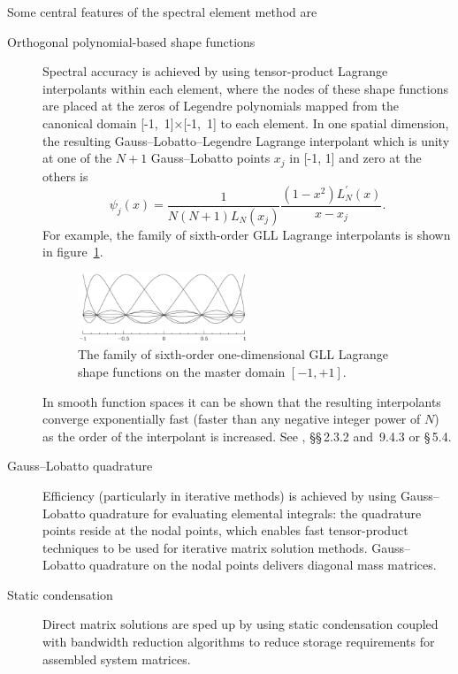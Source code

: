\documentclass[11pt]{report}
\begin{document}
Some central features of the spectral element method are
\begin{description}
\item[Orthogonal polynomial-based shape functions] Spectral accuracy
is achieved by using tensor-product Lagrange interpolants within each
element, where the nodes of these shape functions are placed at the
zeros of Legendre polynomials mapped from the canonical domain
[-1,~1]$\times$[-1,~1] to each element.  In one spatial dimension, the
resulting Gauss--Lobatto--Legendre Lagrange interpolant which is unity
at one of the $N + 1$ Gauss--Lobatto points $x_j$ in [-1, 1] and zero at
the others is
\begin{equation}
\psi_j(x) = \frac{1}{N(N+1)L_N(x_j)}\frac{(1-x^2)L_N^\prime(x)}{x - x_j}.
\end{equation}
For example, the family of sixth-order GLL Lagrange interpolants is
shown in figure~\ref{fig:shapes}.
\begin{figure}
\begin{center}
  \includegraphics[width=0.5\textwidth]{shape7x7}
\end{center}
\caption{The family of sixth-order one-dimensional GLL Lagrange shape
  functions on the master domain $[-1,+1]$.}
\label{fig:shapes}
\end{figure}
In smooth function spaces it can be shown that the resulting
interpolants converge exponentially fast (faster than any negative
integer power of $N$) as the order of the interpolant is increased.
See \citet{chqz88}, \S\S\,2.3.2 and~9.4.3 or \citet{chqz06} \S\,5.4.
\item[Gauss--Lobatto quadrature] Efficiency (particularly in iterative
  methods) is achieved by using Gauss--Lobatto quadrature for
  evaluating elemental integrals: the quadrature points reside at the
  nodal points, which enables fast tensor-product techniques to be
  used for iterative matrix solution methods.  Gauss--Lobatto
  quadrature on the nodal points delivers diagonal mass matrices.
\item[Static condensation]
Direct matrix solutions are sped up by using static condensation
coupled with bandwidth reduction algorithms to reduce storage
requirements for assembled system matrices.
\end{description}
\end{document}

